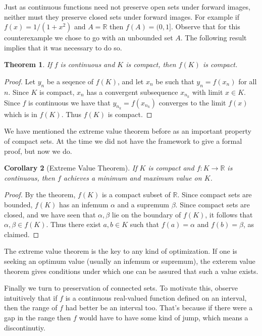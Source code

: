 \documentclass[11pt,oneside]{amsbook}
\newcommand{\R}{\mathbb R}
\theoremstyle{definition}
\theoremstyle{plain}
\newtheorem{theorem}{Theorem}[section]
\newtheorem{corollary}[theorem]{Corollary}
\theoremstyle{definition}
\theoremstyle{remark}
\numberwithin{equation}{section}
\numberwithin{figure}{section}
\begin{document}
Just as continuous functions need not preserve open sets under forward images, neither must they preserve closed sets under forward images. For example if $f(x)=1/(1+x^2)$ and $A=\R$ then $f(A)=(0,1]$. Observe that for this counterexample we chose to go with an unbounded set $A$. The following result implies that it was necessary to do so.

\begin{theorem}
  If $f$ is continuous and $K$ is compact, then $f(K)$ is compact.
\end{theorem}

\begin{proof}
  Let $y_n$ be a seqence of $f(K)$, and let $x_n$ be such that $y_n=f(x_n)$ for all $n$. Since $K$ is compact, $x_n$ has a convergent subsequence $x_{n_k}$ with limit $x\in K$. Since $f$ is continuous we have that $y_{n_k}=f(x_{n_k})$ converges to the limit $f(x)$ which is in $f(K)$. Thus $f(K)$ is compact.
\end{proof}

We have mentioned the extreme value theorem before as an important property of compact sets. At the time we did not have the framework to give a formal proof, but now we do.

\begin{corollary}[Extreme Value Theorem]
  \label{cor:evt}
  If $K$ is compact and $f\colon K\to\R$ is continuous, then $f$ achieves a minimum and maximum value on $K$.
\end{corollary}

\begin{proof}
  By the theorem, $f(K)$ is a compact subset of $\R$. Since compact sets are bounded, $f(K)$ has an infemum $\alpha$ and a supremum $\beta$. Since compact sets are closed, and we have seen that $\alpha,\beta$ lie on the boundary of $f(K)$, it follows that $\alpha,\beta\in f(K)$. Thus there exist $a,b\in K$ such that $f(a)=\alpha$ and $f(b)=\beta$, as claimed.
\end{proof}

The extreme value theorem is the key to any kind of optimization. If one is seeking an optimum value (usually an infemum or supremum), the exterem value theorem gives conditions under which one can be assured that such a value exists.

Finally we turn to preservation of connected sets. To motivate this, observe intuitively that if $f$ is a continuous real-valued function defined on an interval, then the range of $f$ had better be an interval too. That's because if there were a gap in the range then $f$ would have to have some kind of jump, which means a discontinutiy. 
\end{document}
